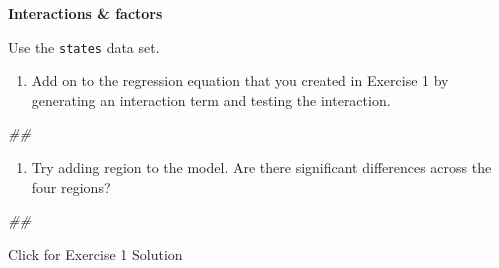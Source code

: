 \documentclass[
]{book}
\newenvironment{Shaded}{\begin{snugshade}}{\end{snugshade}}
\newcommand{\CommentTok}[1]{\textcolor[rgb]{0.56,0.35,0.01}{\textit{#1}}}
\providecommand{\tightlist}{%
  \setlength{\itemsep}{0pt}\setlength{\parskip}{0pt}}
\begin{document}
\textbf{Interactions \& factors}

Use the \texttt{states} data set.

\begin{enumerate}
\def\labelenumi{\arabic{enumi}.}
\tightlist
\item
  Add on to the regression equation that you created in Exercise 1 by generating an interaction term and testing the interaction.
\end{enumerate}

\begin{Shaded}
\begin{Highlighting}[]
\CommentTok{\#\# }
\end{Highlighting}
\end{Shaded}

\begin{enumerate}
\def\labelenumi{\arabic{enumi}.}
\setcounter{enumi}{1}
\tightlist
\item
  Try adding region to the model. Are there significant differences across the four regions?
\end{enumerate}

\begin{Shaded}
\begin{Highlighting}[]
\CommentTok{\#\# }
\end{Highlighting}
\end{Shaded}

{Click for Exercise 1 Solution}
\end{document}
